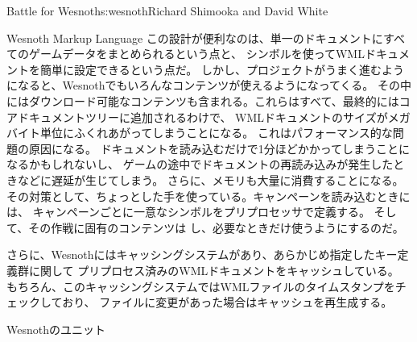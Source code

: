 \begin{aosachapter}{Battle for Wesnoth}{s:wesnoth}{Richard Shimooka and David White}
\begin{aosasect1}{Wesnoth Markup Language}
この設計が便利なのは、単一のドキュメントにすべてのゲームデータをまとめられるという点と、
シンボルを使ってWMLドキュメントを簡単に設定できるという点だ。
しかし、プロジェクトがうまく進むようになると、Wesnothでもいろんなコンテンツが使えるようになってくる。
その中にはダウンロード可能なコンテンツも含まれる。これらはすべて、最終的にはコアドキュメントツリーに追加されるわけで、
WMLドキュメントのサイズがメガバイト単位にふくれあがってしまうことになる。
これはパフォーマンス的な問題の原因になる。
ドキュメントを読み込むだけで1分ほどかかってしまうことになるかもしれないし、
ゲームの途中でドキュメントの再読み込みが発生したときなどに遅延が生じてしまう。
さらに、メモリも大量に消費することになる。
その対策として、ちょっとした手を使っている。キャンペーンを読み込むときには、
キャンペーンごとに一意なシンボルをプリプロセッサで定義する。
そして、その作戦に固有のコンテンツは
し、必要なときだけ使うようにするのだ。

さらに、Wesnothにはキャッシングシステムがあり、あらかじめ指定したキー定義群に関して
プリプロセス済みのWMLドキュメントをキャッシュしている。
もちろん、このキャッシングシステムではWMLファイルのタイムスタンプをチェックしており、
ファイルに変更があった場合はキャッシュを再生成する。

\end{aosasect1}

\begin{aosasect1}{Wesnothのユニット}


\end{aosasect1}
\end{aosachapter}
